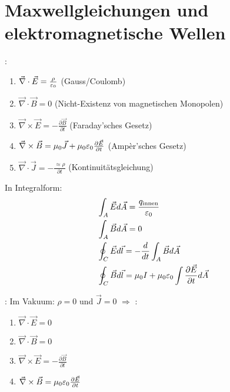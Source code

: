 \section{Maxwellgleichungen und elektromagnetische Wellen}

\vspace{1\baselineskip}

:
\begin{enumerate}
    \item $\vec{\nabla} \cdot \vec{E} = \frac{\rho}{\varepsilon_0}$ \quad (Gauss/Coulomb)
    \item $\vec{\nabla} \cdot \vec{B} = 0$ \quad (Nicht-Existenz von magnetischen Monopolen)
    \item $\vec{\nabla} \times \vec{E} = - \frac{\partial \vec{B}}{\partial t}$ \quad (Faraday'sches Gesetz)
    \item $\vec{\nabla} \times \vec{B} = \mu_0 \vec{J} + \mu_0 \varepsilon_0 \frac{\partial \vec{E}}{\partial t}$
            \quad (Ampèr'sches Gesetz)
    \item $\vec{\nabla} \cdot \vec{J} = - \frac{\approx \rho}{\partial t}$ \quad (Kontinuitätsgleichung)
\end{enumerate}
In Integralform:
\begin{align*}
    &\int_A \vec{E} d \vec{A} = \frac{q_{\text{innen}}}{\varepsilon_0} \\
    &\int_A \vec{B} d \vec{A} = 0 \\
    &\oint_C \vec{E} d \vec{l} = - \frac{d}{dt} \int_A \vec{B} d \vec{A} \\
    &\oint_C \vec{B} d \vec{l} = \mu_0 I + \mu_0 \varepsilon_0 \int \frac{\partial \vec{E}}{\partial t} d \vec{A}
\end{align*}

\vspace{1\baselineskip}

:
Im Vakuum: $\rho = 0$ und $\vec{J} = 0$ $\Rightarrow$ :
\begin{enumerate}
    \item $\vec{\nabla} \cdot \vec{E} = 0$
    \item $\vec{\nabla} \cdot \vec{B} = 0$
    \item $\vec{\nabla} \times \vec{E} = - \frac{\partial \vec{B}}{\partial t}$
    \item $\vec{\nabla} \times \vec{B} = \mu_0 \varepsilon_0 \frac{\partial \vec{E}}{\partial t}$
\end{enumerate}

